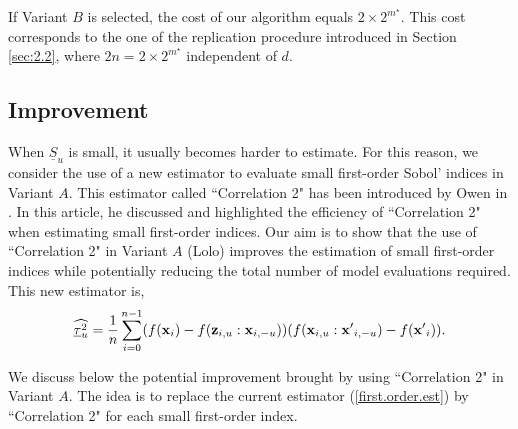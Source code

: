 If Variant $B$ is selected, the cost of our algorithm equals $2 \times 2^{m^{\star}}$. This cost corresponds to the one of the replication procedure introduced in Section \ref{sec:2.2}, where $2n=2\times 2^{m^{\star}}$ independent of $d$.

\subsection{Improvement}
\label{sec:4.2}

When $\underline{S}_u$ is small, it usually becomes harder to estimate. For this reason, we consider the use of a new estimator to evaluate small first-order Sobol' indices in Variant $A$. This estimator called ``Correlation 2" has been introduced by Owen in \cite{Owen}. In this article, he discussed and highlighted the efficiency of ``Correlation 2" when estimating small first-order indices. Our aim is to show that the use of ``Correlation 2" in Variant $A$ {\color{purple} (Lolo) improves the estimation of small first-order indices while potentially reducing the total number of model evaluations required.} This new estimator is,
\begin{equation*}
\widehat{\underline{\tau}_u^2} = \frac{1}{n} \sum \limits_{i=0}^{n-1} (f(\boldsymbol{\mathbf{x}}_i)-f({\boldsymbol{\mathbf{z}}}_{i,u}:{\boldsymbol{\mathbf{x}}}_{i,-u}))(f(\boldsymbol{\mathbf{x}}_{i,u}:{\boldsymbol{\mathbf{x}}'}_{i,-u})-f({\boldsymbol{\mathbf{x}}'}_i)).
\end{equation*}
\bigskip

We discuss below the potential improvement brought by using ``Correlation 2" in Variant $A$. The idea is to replace the current estimator (\ref{first.order.est}) by  ``Correlation 2" for each small first-order index. 

